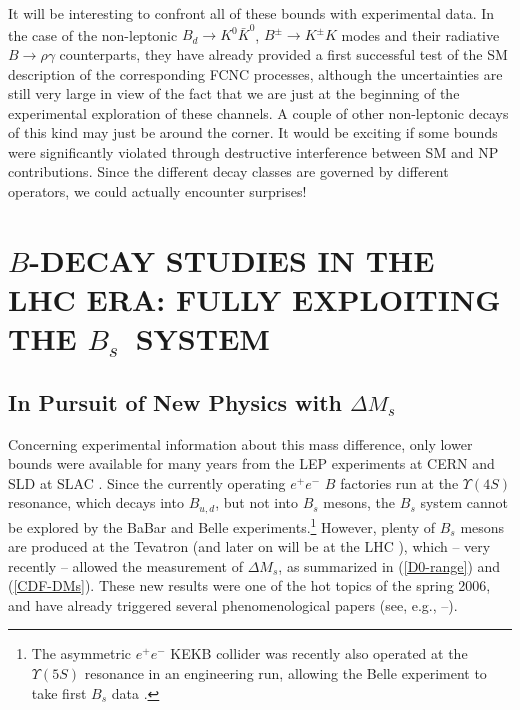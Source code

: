 \documentclass[12pt]{article}
\begin{document}
It will be interesting to confront all of these bounds with experimental data.
In the case of the non-leptonic $B_d\to K^0\bar K^0$, $B^\pm\to K^\pm K$ modes
and their radiative $B\to\rho \gamma$ counterparts, they have already provided a
first successful test of the SM description of the corresponding FCNC processes,
although the uncertainties are still very large in view of the fact that 
we are just at the beginning
of the experimental exploration of these channels. A couple of other non-leptonic
decays of this kind may just be around the corner. It would be exciting if some
bounds were significantly violated through destructive interference between
SM and NP contributions. Since the different decay classes are governed by
different operators, we could actually encounter surprises!



%
%
%
\section{\boldmath$B$\unboldmath-DECAY STUDIES IN THE LHC ERA: FULLY 
EXPLOITING THE \boldmath$B_s$\unboldmath~SYSTEM}\label{sec:LHC}
\setcounter{equation}{0}
%
%
%
\boldmath
\subsection{In Pursuit of New Physics with 
$\Delta M_s$}\label{ssec:Bs-prelim}
\unboldmath
%
%
%
Concerning experimental information about this mass difference, only lower 
bounds were available for many years from the LEP experiments at CERN 
and SLD at SLAC \cite{LEPBOSC}. Since the currently operating $e^+e^-$ $B$ 
factories run at the $\Upsilon(4S)$ resonance, which decays into $B_{u,d}$, 
but not into $B_s$ mesons, the $B_s$ system cannot be explored by the BaBar 
and Belle experiments.\footnote{The asymmetric $e^+e^-$ KEKB collider was 
recently also operated at the $\Upsilon(5S)$ resonance in an engineering run, 
allowing the Belle experiment to take first $B_s$ data \cite{Belle-Y5S}.} 
However, plenty of $B_s$ mesons are produced at 
the Tevatron (and later on will be at the LHC \cite{schneider}), which --
very recently -- allowed the measurement of $\Delta M_s$,
as summarized  in (\ref{D0-range}) and (\ref{CDF-DMs}). 
These new results were one of the hot topics of the spring 2006, and
have already triggered several phenomenological papers 
(see, e.g., \cite{CMNSW}--\cite{GNR}).
\end{document}
